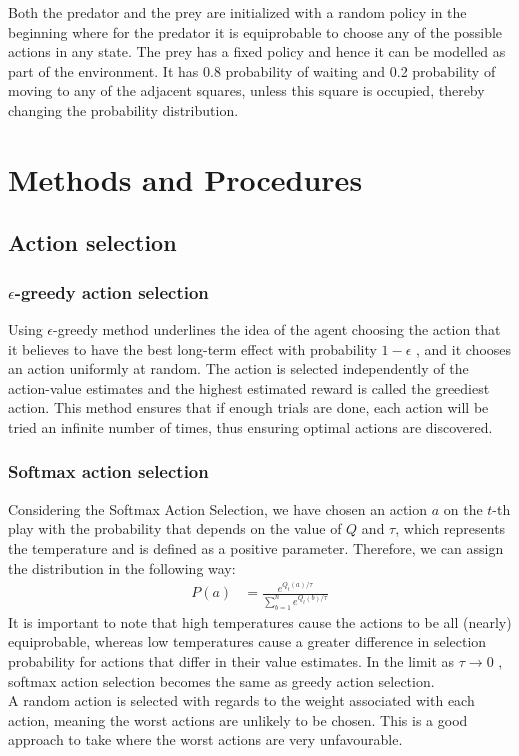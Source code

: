 \documentclass[paper=a4, fontsize=11pt]{scrartcl}
\numberwithin{equation}{section}		%
\numberwithin{figure}{section}			%
\numberwithin{table}{section}				%
\begin{document}
Both the predator and the prey are initialized with a random policy in the beginning where for the predator it is equiprobable to choose any of the possible actions %
in any state. The prey has a fixed policy and hence it can be modelled as part of the environment. It has 0.8 probability of waiting and 0.2 probability of moving to any of the adjacent squares, unless this square is occupied, thereby changing the probability distribution.

\section{Methods and Procedures}
\label{methods}
\subsection{\textbf {Action selection}}
\subsubsection*{$\epsilon$-greedy action selection}
Using $\epsilon$-greedy method underlines the idea of the agent choosing the action that it believes to have the best long-term effect with probability $1-\epsilon$ , and it chooses an action uniformly at random. The action is selected independently of the action-value estimates and the highest estimated reward is called the greediest action. This method ensures that if enough trials are done, each action will be tried an infinite number of times, thus ensuring optimal actions are discovered.

\subsubsection*{Softmax action selection}
Considering the Softmax Action Selection,  we have chosen an action $a$ on the $t$-th play with the probability that depends on the value of $Q$ and $\tau$, which represents the temperature and is defined as a positive parameter. Therefore, we can assign the distribution in the following way:
\begin{align}
P(a) &= \frac{e^{Q_t(a)/\tau}}{\sum_{b=1}^{n} e^{Q_t(b)/\tau}}
\end{align}
It is important to note that high temperatures cause the actions to be all (nearly) equiprobable, whereas low temperatures cause a greater difference in selection probability for actions that differ in their value estimates. In the limit as $\tau \to 0 $  , softmax action selection becomes the same as greedy action selection. \\
A random action is selected with regards to the weight associated with each action, meaning the worst actions are unlikely to be chosen. This is a good approach to take where the worst actions are very unfavourable.\\
\end{document}

